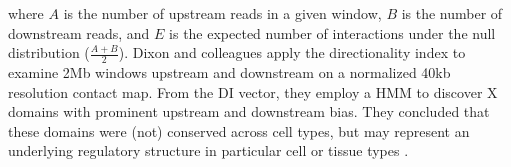 where $A$ is the number of upstream reads in a given window, $B$ is the number of downstream reads, and $E$ is the expected number of interactions under
the null distribution ($\frac{A + B}{2}$).  Dixon and colleagues apply the directionality index to examine 2Mb windows upstream and downstream on a
normalized 40kb resolution contact map.  From the \gls{DI} vector, they employ a \gls{HMM} to discover X domains with prominent upstream and downstream bias.
They concluded that these domains were (not) conserved across cell types, but may represent an underlying regulatory structure in particular cell or tissue
types \citep{dixon2012}.
